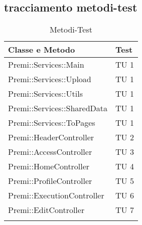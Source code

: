 \subsection{tracciamento metodi-test}
\begin{center}
\bgroup
\def\arraystretch{1.5}
\begin{longtable}{ | p{12cm} | p{2cm} | }
\hline
\cellcolor[gray]{0.9} \textbf{Classe e Metodo} & \cellcolor[gray]{0.9} \textbf{Test}
 \\ \hline
Premi::Services::Main & TU 1 \\ \hline 
Premi::Services::Upload & TU 1 \\ \hline
Premi::Services::Utils  & TU 1 \\ \hline
Premi::Services::SharedData & TU 1 \\ \hline
Premi::Services::ToPages & TU 1 \\ \hline
Premi::HeaderController & TU 2 \\ \hline
Premi::AccessController & TU 3 \\ \hline
Premi::HomeController & TU 4\\ \hline
Premi::ProfileController & TU 5 \\ \hline
Premi::ExecutionController & TU 6 \\ \hline
Premi::EditController & TU 7 \\ \hline

\caption{Metodi-Test}
\end{longtable}
\egroup
\end{center}